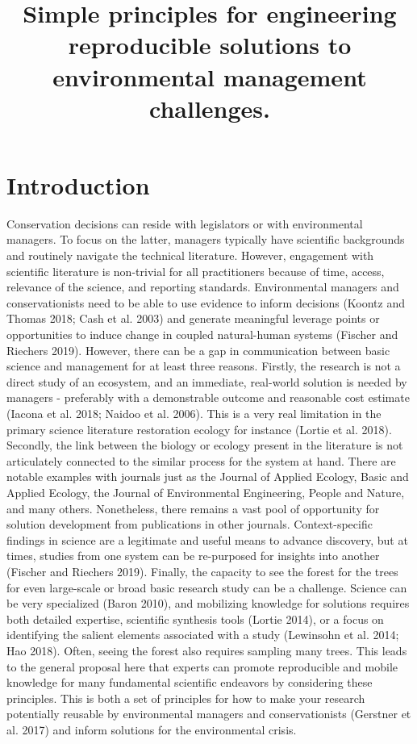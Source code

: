 \documentclass[fleqn,10pt]{wlpeerj} %
\title{Simple principles for engineering reproducible solutions to
environmental management challenges.}
\author[]{}
\begin{document}
\flushbottom
\maketitle
\thispagestyle{empty}

\hypertarget{introduction}{%
\section*{Introduction}\label{introduction}}

Conservation decisions can reside with legislators or with environmental
managers. To focus on the latter, managers typically have scientific
backgrounds and routinely navigate the technical literature. However,
engagement with scientific literature is non-trivial for all
practitioners because of time, access, relevance of the science, and
reporting standards. Environmental managers and conservationists need to
be able to use evidence to inform decisions (Koontz and Thomas 2018;
Cash et al. 2003) and generate meaningful leverage points or
opportunities to induce change in coupled natural-human systems (Fischer
and Riechers 2019). However, there can be a gap in communication between
basic science and management for at least three reasons. Firstly, the
research is not a direct study of an ecosystem, and an immediate,
real-world solution is needed by managers - preferably with a
demonstrable outcome and reasonable cost estimate (Iacona et al. 2018;
Naidoo et al. 2006). This is a very real limitation in the primary
science literature restoration ecology for instance (Lortie et al.
2018). Secondly, the link between the biology or ecology present in the
literature is not articulately connected to the similar process for the
system at hand. There are notable examples with journals just as the
Journal of Applied Ecology, Basic and Applied Ecology, the Journal of
Environmental Engineering, People and Nature, and many others.
Nonetheless, there remains a vast pool of opportunity for solution
development from publications in other journals. Context-specific
findings in science are a legitimate and useful means to advance
discovery, but at times, studies from one system can be re-purposed for
insights into another (Fischer and Riechers 2019). Finally, the capacity
to see the forest for the trees for even large-scale or broad basic
research study can be a challenge. Science can be very specialized
(Baron 2010), and mobilizing knowledge for solutions requires both
detailed expertise, scientific synthesis tools (Lortie 2014), or a focus
on identifying the salient elements associated with a study (Lewinsohn
et al. 2014; Hao 2018). Often, seeing the forest also requires sampling
many trees. This leads to the general proposal here that experts can
promote reproducible and mobile knowledge for many fundamental
scientific endeavors by considering these principles. This is both a set
of principles for how to make your research potentially reusable by
environmental managers and conservationists (Gerstner et al. 2017) and
inform solutions for the environmental crisis.
\end{document}
